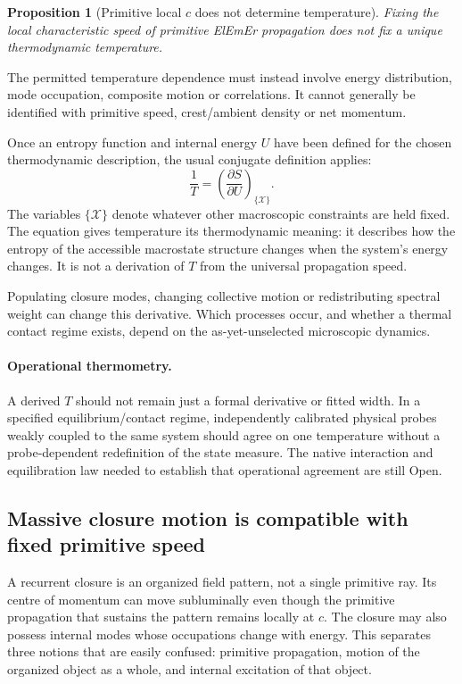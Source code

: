 \documentclass[11pt]{article}
\newtheorem{proposition}[theorem]{Proposition}
\theoremstyle{definition}
\newcommand{\ElEmEr}{\mbox{ElEmEr}}
\begin{document}
\begin{proposition}[Primitive local $c$ does not determine temperature]
\label{prop:c-not-temperature}
Fixing the local characteristic speed of primitive \ElEmEr{} propagation does not fix a
unique thermodynamic temperature.
\end{proposition}

The permitted temperature dependence must instead involve energy distribution,
mode occupation, composite motion or correlations.  It cannot generally be
identified with primitive speed, crest/ambient density or net momentum.

Once an entropy function and internal energy $U$ have been defined for the chosen
thermodynamic description, the usual conjugate definition applies:
\begin{equation}
  \boxed{
  \frac{1}{T}
  =\left(\frac{\partial S}{\partial U}\right)_{\{\mathcal X\}}.}
  \label{eq:temperature-control}
\end{equation}
The variables $\{\mathcal X\}$ denote whatever other macroscopic constraints are held
fixed.  The equation gives temperature its thermodynamic meaning: it describes how the
entropy of the accessible macrostate structure changes when the system's energy changes.
It is not a derivation of $T$ from the universal propagation speed.

Populating closure modes, changing collective motion or redistributing spectral
weight can change this derivative.  Which processes occur, and whether a thermal
contact regime exists, depend on the as-yet-unselected microscopic dynamics.

\paragraph{Operational thermometry.}
A derived $T$ should not remain just a formal derivative or fitted width.
In a specified equilibrium/contact regime, independently calibrated physical
probes weakly coupled to the same system should agree on one temperature
without a probe-dependent redefinition of the state measure. The native
interaction and equilibration law needed to establish that operational
agreement are still Open.

\subsection{Massive closure motion is compatible with fixed primitive speed}

A recurrent closure is an organized field pattern, not a single primitive ray.  Its
centre of momentum can move subluminally even though the primitive propagation that
sustains the pattern remains locally at $c$.  The closure may also possess internal modes
whose occupations change with energy.  This separates three notions that are easily
confused: primitive propagation, motion of the organized object as a whole, and internal
excitation of that object.
\end{document}
